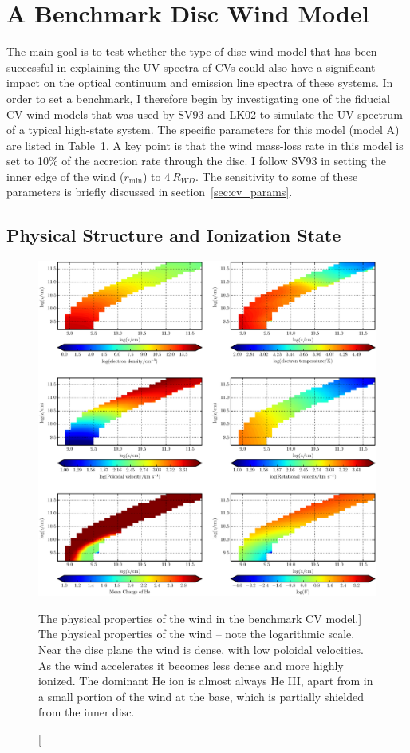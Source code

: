 \nocite{walker1963}

\section{A Benchmark Disc Wind Model}
\label{modela}

The main goal is to test whether the type of disc wind model that has
been successful in explaining the UV spectra of CVs could also have a
significant impact on the optical continuum and emission line spectra
of these systems. In order to set a benchmark, I therefore begin by
investigating one of the fiducial CV wind models that was used by SV93
and LK02 to simulate the UV spectrum of a typical high-state
system. The specific parameters for this model (model A) are listed in
Table~1. A key point is that the wind mass-loss rate in this model is
set to 10$\%$ of the accretion rate through the disc. I follow SV93
in setting the inner edge of the wind ($r_{\mathrm{min}}$) to $4~R_{WD}$. 
The sensitivity to some of these parameters is briefly discussed in
section~\ref{sec:cv_params}. 

\subsection{Physical Structure and Ionization State}
\label{modela_ionization}

\begin{figure}
\includegraphics[width=1.0\textwidth]{figures/05-cvpaper/fig5.eps}
\caption
[The physical properties of the wind in the benchmark CV model.]
{
The physical properties of the wind -- note the logarithmic scale. 
Near the disc plane the wind is dense, with low poloidal velocities.
As the wind accelerates it becomes less dense
and more highly ionized. The dominant He ion
is almost always He III, apart from in a small
portion of the wind at the base, which is partially shielded
from the inner disc.
}
\label{wind}
\end{figure}

